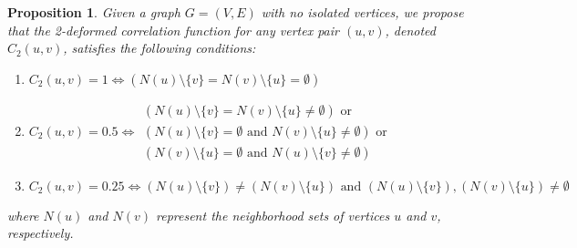 \documentclass{article}
\newtheorem{prop}[theorem]{Proposition}
\begin{document}
\begin{prop} \label{prop:correlation_function_relation_with_graph_structure}
Given a graph $ G = (V, E) $ with no isolated vertices, we propose that the 2-deformed correlation function for any vertex pair $ (u, v) $, denoted $ C_2(u, v) $, satisfies the following conditions:
\begin{enumerate}
    \item $C_2(u, v) = 1 \iff (N(u) \setminus \{v\} = N(v) \setminus \{u\} = \emptyset)$
    \item
    $C_2(u, v) = 0.5 \iff 
\begin{aligned}(N(u) \setminus \{v\} = N(v) \setminus \{u\} \neq \emptyset) \text{ or } \\
(N(u) \setminus \{v\} = \emptyset \text{ and } N(v) \setminus \{u\} \neq \emptyset) 
\text{ or } \\
(N(v) \setminus \{u\} = \emptyset \text{ and } N(u) \setminus \{v\} \neq \emptyset)
\end{aligned}$


    \item $ C_2(u, v) = 0.25 \iff (N(u) \setminus \{v\}) \neq (N(v) \setminus \{u\}) \text{ and } (N(u) \setminus \{v\}), (N(v) \setminus \{u\}) \neq \emptyset $

\end{enumerate}

where $ N(u) $ and $ N(v) $ represent the neighborhood sets of vertices $ u $ and $ v $, respectively.
\end{prop}
\end{document}
